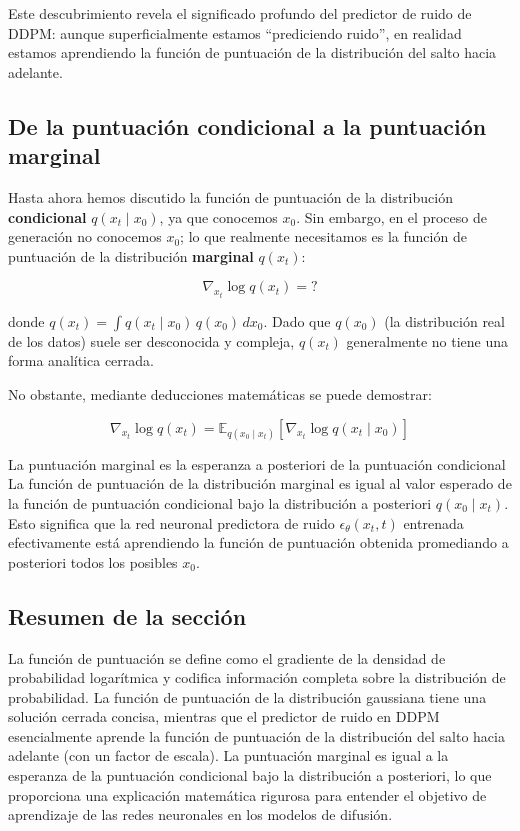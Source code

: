\documentclass[a4paper]{article}
\begin{document}
Este descubrimiento revela el significado profundo del predictor de ruido de DDPM: aunque superficialmente estamos ``prediciendo ruido'', en realidad estamos aprendiendo la función de puntuación de la distribución del salto hacia adelante.

\subsection{De la puntuación condicional a la puntuación marginal}

Hasta ahora hemos discutido la función de puntuación de la distribución \textbf{condicional} $q(x_t \mid x_0)$, ya que conocemos $x_0$. Sin embargo, en el proceso de generación no conocemos $x_0$; lo que realmente necesitamos es la función de puntuación de la distribución \textbf{marginal} $q(x_t)$:

$$\nabla_{x_t} \log q(x_t) = ?$$

donde $q(x_t) = \int q(x_t \mid x_0)\, q(x_0)\, dx_0$. Dado que $q(x_0)$ (la distribución real de los datos) suele ser desconocida y compleja, $q(x_t)$ generalmente no tiene una forma analítica cerrada.

No obstante, mediante deducciones matemáticas se puede demostrar:

$$\nabla_{x_t} \log q(x_t) = \mathbb{E}_{q(x_0 \mid x_t)}\left[\nabla_{x_t} \log q(x_t \mid x_0)\right]$$

\begin{importantbox}{La puntuación marginal es la esperanza a posteriori de la puntuación condicional}
La función de puntuación de la distribución marginal es igual al valor esperado de la función de puntuación condicional bajo la distribución a posteriori $q(x_0 \mid x_t)$. Esto significa que la red neuronal predictora de ruido $\epsilon_\theta(x_t, t)$ entrenada efectivamente está aprendiendo la función de puntuación obtenida promediando a posteriori todos los posibles $x_0$.
\end{importantbox}

\subsection{Resumen de la sección}

La función de puntuación se define como el gradiente de la densidad de probabilidad logarítmica y codifica información completa sobre la distribución de probabilidad. La función de puntuación de la distribución gaussiana tiene una solución cerrada concisa, mientras que el predictor de ruido en DDPM esencialmente aprende la función de puntuación de la distribución del salto hacia adelante (con un factor de escala). La puntuación marginal es igual a la esperanza de la puntuación condicional bajo la distribución a posteriori, lo que proporciona una explicación matemática rigurosa para entender el objetivo de aprendizaje de las redes neuronales en los modelos de difusión.
\end{document}
